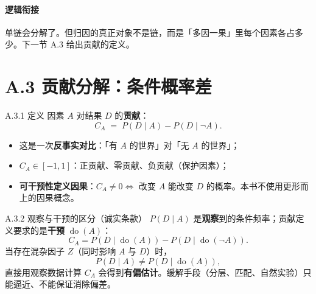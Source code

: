 \documentclass[../../main2.tex]{subfiles}
\begin{document}
	\paragraph*{逻辑衔接}
	单链会分解了。但归因的真正对象不是链，而是「多因一果」里每个因素各占多少。下一节 A.3 给出贡献的定义。

	\section{A.3 贡献分解：条件概率差}
	\label{app:contribution}


	\begin{mathbox}{A.3.1 定义}
		因素 $A$ 对结果 $D$ 的\textbf{贡献}：
		\[ C_A \;=\; P(D \mid A) - P(D \mid \neg A). \]
		\begin{itemize}
			\item 这是一次\textbf{反事实对比}：「有 $A$ 的世界」对「无 $A$ 的世界」；
			\item $C_A \in [-1, 1]$：正贡献、零贡献、负贡献（保护因素）；
			\item \textbf{可干预性定义因果}：$C_A \neq 0 \iff$ 改变 $A$ 能改变 $D$ 的概率。本书不使用更形而上的因果概念。
		\end{itemize}
	\end{mathbox}

	\begin{mathbox}{A.3.2 观察与干预的区分（诚实条款）}
		$P(D \mid A)$ 是\textbf{观察}到的条件频率；贡献定义要求的是\textbf{干预} $\operatorname{do}(A)$：
		\[ C_A = P(D \mid \operatorname{do}(A)) - P(D \mid \operatorname{do}(\neg A)). \]
		当存在混杂因子 $Z$（同时影响 $A$ 与 $D$）时，
		\[ P(D \mid A) \neq P(D \mid \operatorname{do}(A)), \]
		直接用观察数据计算 $C_A$ 会得到\textbf{有偏估计}。缓解手段（分层、匹配、自然实验）只能逼近、不能保证消除偏差。
	\end{mathbox}
\end{document}
